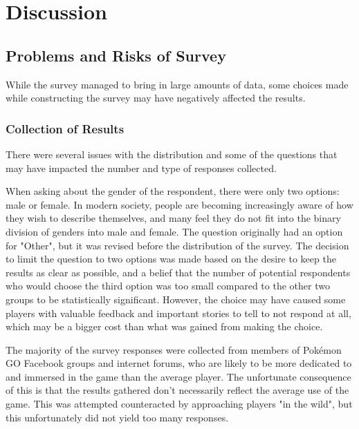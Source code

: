
\chapter{Discussion}

\section{Problems and Risks of Survey}
\label{sec:problems-with-survey}

While the survey managed to bring in large amounts of data, some choices made while constructing the survey may have negatively affected the results.

\subsection{Collection of Results}

There were several issues with the distribution and some of the questions that may have impacted the number and type of responses collected.

When asking about the gender of the respondent, there were only two options: male or female. In modern society, people are becoming increasingly aware of how they wish to describe themselves, and many feel they do not fit into the binary division of genders into male and female. The question originally had an option for "Other", but it was revised before the distribution of the survey. The decision to limit the question to two options was made based on the desire to keep the results as clear as possible, and a belief that the number of potential respondents who would choose the third option was too small compared to the other two groups to be statistically significant. However, the choice may have caused some players with valuable feedback and important stories to tell to not respond at all, which may be a bigger cost than what was gained from making the choice.

The majority of the survey responses were collected from members of Pokémon GO Facebook groups and internet forums, who are likely to be more dedicated to and immersed in the game than the average player. The unfortunate consequence of this is that the results gathered don't necessarily reflect the average use of the game. This was attempted counteracted by approaching players "in the wild", but this unfortunately did not yield too many responses.

